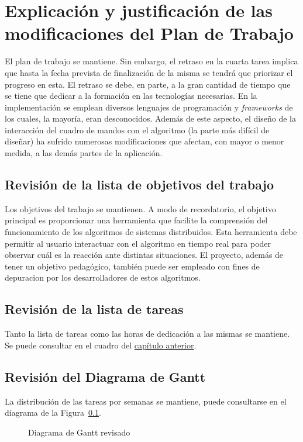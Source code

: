 \chapter*{Explicación y justificación de las modificaciones del Plan de Trabajo}

El plan de trabajo se mantiene. Sin embargo, el retraso en la cuarta tarea implica que hasta la fecha prevista de finalización de la misma se tendrá que priorizar el progreso en esta. El retraso se debe, en parte, a la gran cantidad de tiempo que se tiene que dedicar a la formación en las tecnologías necesarias. En la implementación se emplean diversos lenguajes de programación y \textit{frameworks} de los cuales, la mayoría, eran desconocidos. Además de este aspecto, el diseño de la interacción del cuadro de mandos con el algoritmo (la parte más difícil de diseñar) ha sufrido numerosas modificaciones que afectan, con mayor o menor medida, a las demás partes de la aplicación.

\section{Revisión de la lista de objetivos del trabajo}

Los objetivos del trabajo se mantienen. A modo de recordatorio, el objetivo principal es proporcionar una herramienta que facilite la comprensión del funcionamiento de los algoritmos de sistemas distribuidos. Esta herramienta debe permitir al usuario interactuar con el algoritmo en tiempo real para poder observar cuál es la reacción ante distintas situaciones. El proyecto, además de tener un objetivo pedagógico, también puede ser empleado con fines de depuracion por los desarrolladores de estos algoritmos.

\section{Revisión de la lista de tareas}

Tanto la lista de tareas como las horas de dedicación a las mismas se mantiene. Se puede consultar en el cuadro del \hyperref[ch:trabajo_realizado]{capítulo anterior}.

\newpage

\section{Revisión del Diagrama de Gantt}

La distribución de las tareas por semanas se mantiene, puede consultarse en el diagrama de la Figura~\ref{revision_gantt}.

\begin{figure}[H]
	{\fontsize{3}{4}\selectfont
		\centering
    	\def\svgscale{0.26}
    	
    	\caption{Diagrama de Gantt revisado}
    	\label{revision_gantt}
	}
\end{figure}

